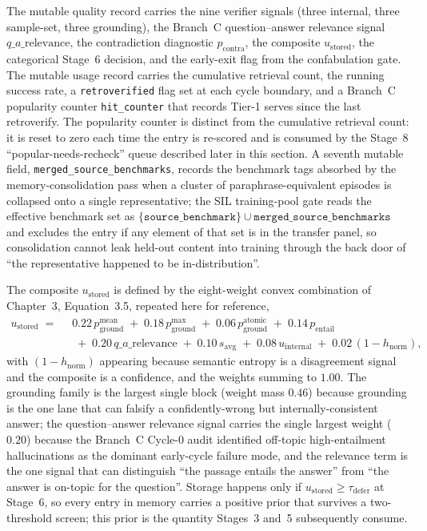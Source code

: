 The mutable quality record carries the nine verifier signals (three internal, three sample-set, three grounding), the Branch~C question--answer relevance signal $q\_a\_\text{relevance}$, the contradiction diagnostic $p_{\text{contra}}$, the composite $u_{\text{stored}}$, the categorical Stage~6 decision, and the early-exit flag from the confabulation gate. The mutable usage record carries the cumulative retrieval count, the running success rate, a \texttt{retroverified} flag set at each cycle boundary, and a Branch~C popularity counter \texttt{hit\_counter} that records Tier-1 serves since the last retroverify. The popularity counter is distinct from the cumulative retrieval count: it is reset to zero each time the entry is re-scored and is consumed by the Stage~8 ``popular-needs-recheck'' queue described later in this section. A seventh mutable field, \texttt{merged\_source\_benchmarks}, records the benchmark tags absorbed by the memory-consolidation pass when a cluster of paraphrase-equivalent episodes is collapsed onto a single representative; the SIL training-pool gate reads the effective benchmark set as $\{\texttt{source\_benchmark}\} \cup \texttt{merged\_source\_benchmarks}$ and excludes the entry if any element of that set is in the transfer panel, so consolidation cannot leak held-out content into training through the back door of ``the representative happened to be in-distribution''.

The composite $u_{\text{stored}}$ is defined by the eight-weight convex combination of Chapter~3, Equation~3.5, repeated here for reference,
\begin{equation}
\begin{aligned}
u_{\text{stored}} \;=\;\;&
 0.22\,p_{\text{ground}}^{\text{mean}}
\;+\; 0.18\,p_{\text{ground}}^{\max}
\;+\; 0.06\,p_{\text{ground}}^{\text{atomic}}
\;+\; 0.14\,p_{\text{entail}} \\ &
\;+\; 0.20\,q\_a\_\text{relevance}
\;+\; 0.10\,s_{\text{avg}}
\;+\; 0.08\,u_{\text{internal}}
\;+\; 0.02\,(1 - h_{\text{norm}}),
\end{aligned}
\label{eq:ustored}
\end{equation}
with $(1 - h_{\text{norm}})$ appearing because semantic entropy is a disagreement signal and the composite is a confidence, and the weights summing to $1.00$. The grounding family is the largest single block (weight mass $0.46$) because grounding is the one lane that can falsify a confidently-wrong but internally-consistent answer; the question--answer relevance signal carries the single largest weight ($0.20$) because the Branch~C Cycle-0 audit identified off-topic high-entailment hallucinations as the dominant early-cycle failure mode, and the relevance term is the one signal that can distinguish ``the passage entails the answer'' from ``the answer is on-topic for the question''. Storage happens only if $u_{\text{stored}} \geq \tau_{\text{defer}}$ at Stage~6, so every entry in memory carries a positive prior that survives a two-threshold screen; this prior is the quantity Stages~3 and~5 subsequently consume.

